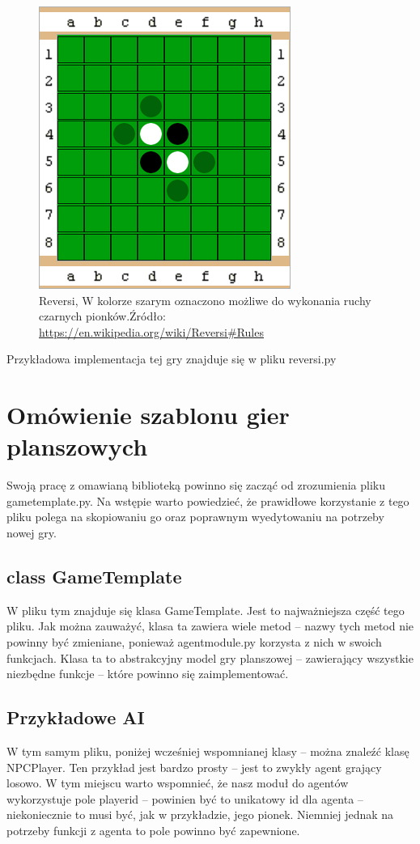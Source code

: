 \documentclass[polish,shortabstract,inz]{iithesis}
\begin{document}
\begin{figure}[H]
  \includegraphics[scale=0.66]{./images/reversi_moves.png}
  \centering
  \caption{Reversi, W kolorze szarym oznaczono możliwe do wykonania ruchy czarnych pionków.\newline Źródło:\,\url{https://en.wikipedia.org/wiki/Reversi\#Rules}}
  \label{fig:reversi_moves}
\end{figure}

Przykładowa implementacja tej gry znajduje się w pliku reversi.py


\section{Omówienie szablonu gier planszowych}
Swoją pracę z omawianą biblioteką powinno się zacząć od zrozumienia pliku game\textunderscore template.py.
Na wstępie warto powiedzieć, że prawidłowe korzystanie z tego pliku polega na skopiowaniu go oraz poprawnym wyedytowaniu na potrzeby nowej gry.

\subsection{class GameTemplate}
W pliku tym znajduje się klasa GameTemplate.
Jest to najważniejsza część tego pliku.
Jak można zauważyć, klasa ta zawiera wiele metod -- nazwy tych metod nie powinny być zmieniane, ponieważ agent\textunderscore module.py korzysta z nich w swoich funkcjach.
Klasa ta to abstrakcyjny model gry planszowej -- zawierający wszystkie niezbędne funkcje -- które powinno się zaimplementować.

\subsection{Przykładowe AI}
W tym samym pliku, poniżej wcześniej wspomnianej klasy -- można znaleźć klasę NPCPlayer. Ten przykład jest bardzo prosty -- jest to zwykły agent grający losowo.
W tym miejscu warto wspomnieć, że nasz moduł do agentów wykorzystuje pole player\textunderscore id -- powinien być to unikatowy id dla agenta -- niekoniecznie to musi być, jak w przykładzie, jego pionek.
Niemniej jednak na potrzeby funkcji z agenta to pole powinno być zapewnione.
\end{document}
